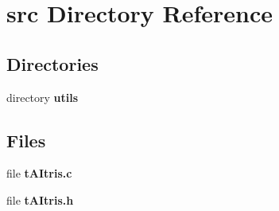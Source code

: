 \section{src Directory Reference}
\label{dir_68267d1309a1af8e8297ef4c3efbcdba}
\subsection*{Directories}
\begin{DoxyCompactItemize}
\item 
directory \textbf{ utils}
\end{DoxyCompactItemize}
\subsection*{Files}
\begin{DoxyCompactItemize}
\item 
file \textbf{ t\+A\+Itris.\+c}
\item 
file \textbf{ t\+A\+Itris.\+h}
\end{DoxyCompactItemize}
